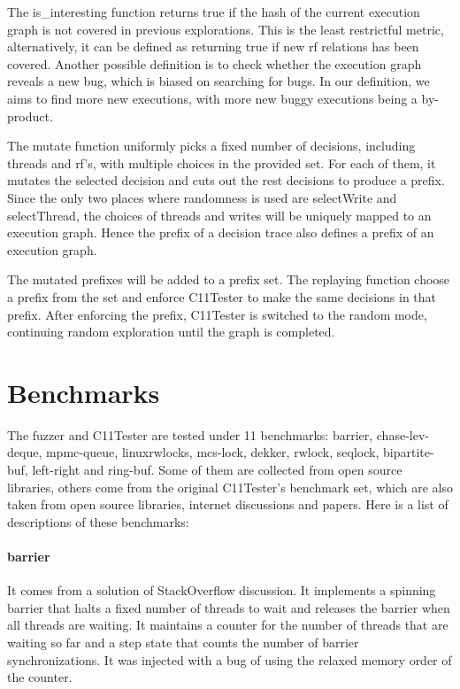 The is\_interesting function returns true if the hash of the current execution graph is not covered in previous explorations. This is the least restrictful metric, alternatively, it can be defined as returning true if new rf relations has been covered. Another possible definition is to check whether the execution graph reveals a new bug, which is biased on searching for bugs. In our definition, we aims to find more new executions, with more new buggy executions being a by-product. 

The mutate function uniformly picks a fixed number of decisions, including threads and rf's, with multiple choices in the provided set. For each of them, it mutates the selected decision and cuts out the rest decisions to produce a prefix. Since the only two places where randomness is used are selectWrite and selectThread, the choices of threads and writes will be uniquely mapped to an execution graph. Hence the prefix of a decision trace also defines a prefix of an execution graph. 


The mutated prefixes will be added to a prefix set. The replaying function choose a prefix from the set and enforce C11Tester to make the same decisions in that prefix. After enforcing the prefix,  C11Tester is switched to the random mode, continuing random exploration until the graph is completed. 

\section{Benchmarks}

The fuzzer and C11Tester are tested under 11 benchmarks: barrier, chase-lev-deque, mpmc-queue, linuxrwlocks, mcs-lock, dekker, rwlock, seqlock, bipartite-buf, left-right and ring-buf. Some of them are collected from open source libraries, others come from the original C11Tester's benchmark set, which are also taken from open source libraries, internet discussions and papers. Here is a list of descriptions of these benchmarks:

\paragraph{barrier} It comes from a solution of StackOverflow discussion. It implements a spinning barrier that halts a fixed number of threads to wait and releases the barrier when all threads are waiting. It maintains a counter for the number of threads that are waiting so far and a step state that counts the number of barrier synchronizations. It was injected with a bug of using the relaxed memory order of the counter.

